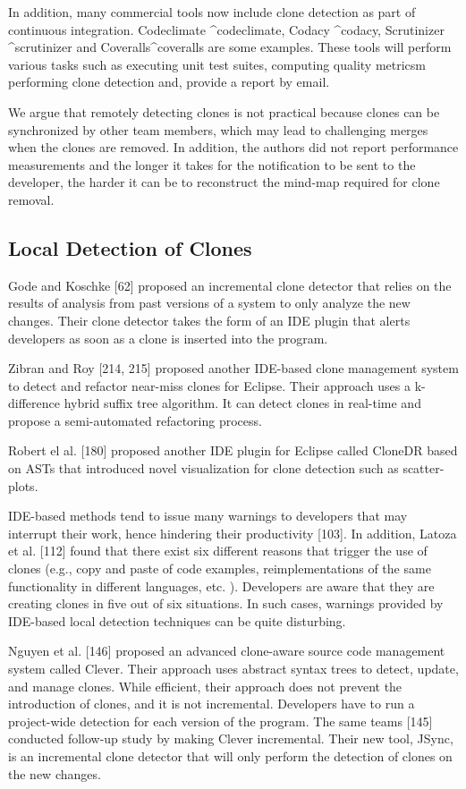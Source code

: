 \documentclass[12pt]{report}
\begin{document}
In addition, many commercial tools now include clone detection as part
of continuous integration. Codeclimate \^{}codeclimate, Codacy
\^{}codacy, Scrutinizer \^{}scrutinizer and Coveralls\^{}coveralls are
some examples. These tools will perform various tasks such as executing
unit test suites, computing quality metricsm performing clone detection
and, provide a report by email.

We argue that remotely detecting clones is not practical because clones
can be synchronized by other team members, which may lead to challenging
merges when the clones are removed. In addition, the authors did not
report performance measurements and the longer it takes for the
notification to be sent to the developer, the harder it can be to
reconstruct the mind-map required for clone removal.

\subsection{Local Detection of Clones}\label{local-detection-of-clones}

Gode and Koschke {[}62{]} proposed an incremental clone detector that
relies on the results of analysis from past versions of a system to only
analyze the new changes. Their clone detector takes the form of an IDE
plugin that alerts developers as soon as a clone is inserted into the
program.

Zibran and Roy {[}214, 215{]} proposed another IDE-based clone
management system to detect and refactor near-miss clones for Eclipse.
Their approach uses a k-difference hybrid suffix tree algorithm. It can
detect clones in real-time and propose a semi-automated refactoring
process.

Robert el al. {[}180{]} proposed another IDE plugin for Eclipse called
CloneDR based on ASTs that introduced novel visualization for clone
detection such as scatter-plots.

IDE-based methods tend to issue many warnings to developers that may
interrupt their work, hence hindering their productivity {[}103{]}. In
addition, Latoza et al. {[}112{]} found that there exist six different
reasons that trigger the use of clones (e.g., copy and paste of code
examples, reimplementations of the same functionality in different
languages, etc. ). Developers are aware that they are creating clones in
five out of six situations. In such cases, warnings provided by
IDE-based local detection techniques can be quite disturbing.

Nguyen et al. {[}146{]} proposed an advanced clone-aware source code
management system called Clever. Their approach uses abstract syntax
trees to detect, update, and manage clones. While efficient, their
approach does not prevent the introduction of clones, and it is not
incremental. Developers have to run a project-wide detection for each
version of the program. The same teams {[}145{]} conducted follow-up
study by making Clever incremental. Their new tool, JSync, is an
incremental clone detector that will only perform the detection of
clones on the new changes.
\end{document}
